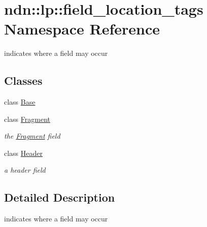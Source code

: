\hypertarget{namespacendn_1_1lp_1_1field__location__tags}{}\section{ndn\+:\+:lp\+:\+:field\+\_\+location\+\_\+tags Namespace Reference}
\label{namespacendn_1_1lp_1_1field__location__tags}


indicates where a field may occur  


\subsection*{Classes}
\begin{DoxyCompactItemize}
\item 
class \hyperlink{classndn_1_1lp_1_1field__location__tags_1_1Base}{Base}
\item 
class \hyperlink{classndn_1_1lp_1_1field__location__tags_1_1Fragment}{Fragment}
\begin{DoxyCompactList}\small\item\em the \hyperlink{classndn_1_1lp_1_1field__location__tags_1_1Fragment}{Fragment} field \end{DoxyCompactList}\item 
class \hyperlink{classndn_1_1lp_1_1field__location__tags_1_1Header}{Header}
\begin{DoxyCompactList}\small\item\em a header field \end{DoxyCompactList}\end{DoxyCompactItemize}


\subsection{Detailed Description}
indicates where a field may occur 